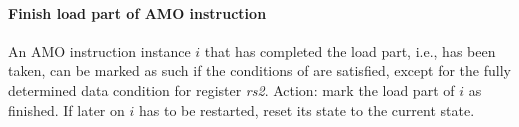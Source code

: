 \paragraph{Finish load part of AMO instruction}\label{omm:thread:finish_load_part}
An AMO instruction instance $i$ that has completed the load part, i.e.,  has been taken, can be marked as such if the conditions of  are satisfied, except for the fully determined data condition for register {\em rs2}.
Action: mark the load part of $i$ as finished. If later on $i$ has to be restarted, reset its state to the current state.


%
%

